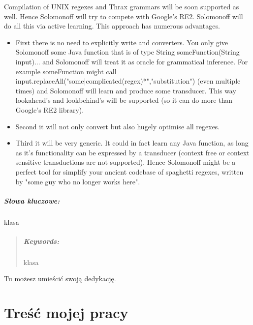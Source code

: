 \documentclass[oneside,polski,logo]{amuthesis}
\begin{document}
\begin{streszczenie}
Compilation of UNIX regexes and Thrax grammars will be soon supported as well. Hence Solomonoff will try to compete with Google's RE2. Solomonoff will do all this via active learning. This approach has numerous advantages.

\begin{itemize}
	\item First there is no need to explicitly write and converters. You only give Solomonoff some Java function that is of type String someFunction(String input){...} and Solomonoff will treat it as oracle for grammatical inference. For example someFunction might call input.replaceAll("some|complicated(regex)*","substitution") (even multiple times) and Solomonoff will learn and produce some transducer. This way lookahead's and lookbehind's will be supported (so it can do more than Google's RE2 library).

	\item Second it will not only convert but also hugely optimise all regexes.
	
	\item Third it will be very generic. It could in fact learn any Java function, as long as it's functionality can be expressed by a transducer (context free or context sensitive transductions are not supported). Hence Solomonoff might be a perfect tool for simplify your ancient codebase of spaghetti regexes, written by "some guy who no longer works here".
	
\end{itemize}


\paragraph{Słowa kluczowe:} klasa
\end{streszczenie}

\begin{abstract}
\lipsum[2]

\paragraph{Keywords:} klasa
\end{abstract}

\begin{dedykacja}
Tu możesz umieścić swoją dedykację.
\end{dedykacja}

\tableofcontents


\chapter{Treść mojej pracy}

\lipsum[3]
\end{document}
